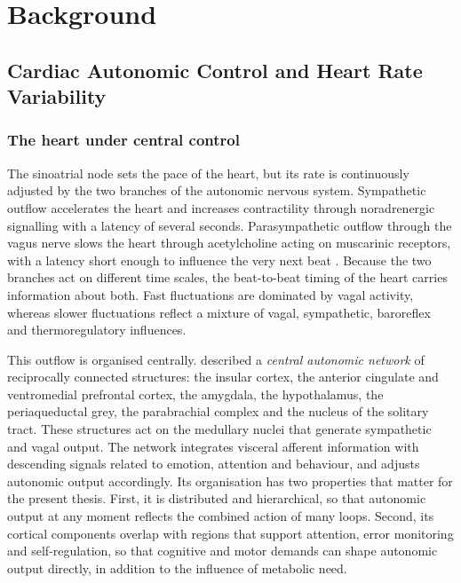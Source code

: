 \section{Background}
\label{sec:background}

\subsection{Cardiac Autonomic Control and Heart Rate Variability}
\label{sec:bg-autonomic}

\subsubsection{The heart under central control}

The sinoatrial node sets the pace of the heart, but its rate is continuously adjusted by the two branches of the autonomic nervous system. Sympathetic outflow accelerates the heart and increases contractility through noradrenergic signalling with a latency of several seconds. Parasympathetic outflow through the vagus nerve slows the heart through acetylcholine acting on muscarinic receptors, with a latency short enough to influence the very next beat \citep{taskforce1996}. Because the two branches act on different time scales, the beat-to-beat timing of the heart carries information about both. Fast fluctuations are dominated by vagal activity, whereas slower fluctuations reflect a mixture of vagal, sympathetic, baroreflex and thermoregulatory influences.

This outflow is organised centrally. \citet{benarroch1993} described a \emph{central autonomic network} of reciprocally connected structures: the insular cortex, the anterior cingulate and ventromedial prefrontal cortex, the amygdala, the hypothalamus, the periaqueductal grey, the parabrachial complex and the nucleus of the solitary tract. These structures act on the medullary nuclei that generate sympathetic and vagal output. The network integrates visceral afferent information with descending signals related to emotion, attention and behaviour, and adjusts autonomic output accordingly. Its organisation has two properties that matter for the present thesis. First, it is distributed and hierarchical, so that autonomic output at any moment reflects the combined action of many loops. Second, its cortical components overlap with regions that support attention, error monitoring and self-regulation, so that cognitive and motor demands can shape autonomic output directly, in addition to the influence of metabolic need.


